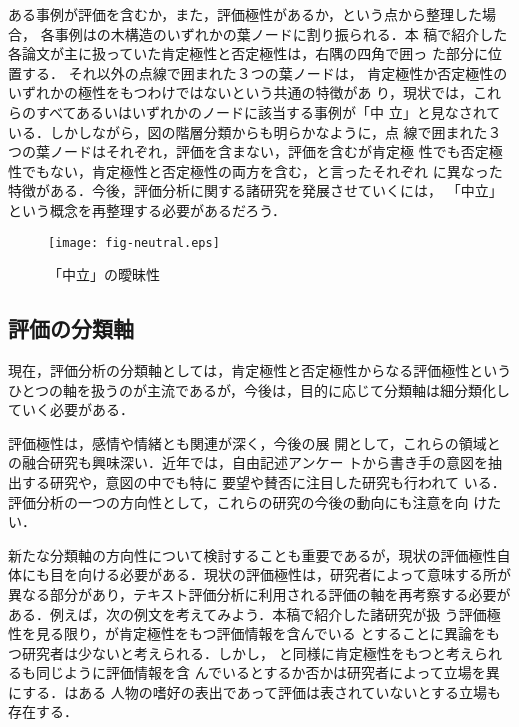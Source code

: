 ある事例が評価を含むか，また，評価極性があるか，という点から整理した場合，
各事例はの木構造のいずれかの葉ノードに割り振られる．本
稿で紹介した各論文が主に扱っていた肯定極性と否定極性は，右隅の四角で囲っ
た部分に位置する．
それ以外の点線で囲まれた３つの葉ノードは，
肯定極性か否定極性のいずれかの極性をもつわけではないという共通の特徴があ
り，現状では，これらのすべてあるいはいずれかのノードに該当する事例が「中
立」と見なされている．しかしながら，図の階層分類からも明らかなように，点
線で囲まれた３つの葉ノードはそれぞれ，評価を含まない，評価を含むが肯定極
性でも否定極性でもない，肯定極性と否定極性の両方を含む，と言ったそれぞれ
に異なった特徴がある．今後，評価分析に関する諸研究を発展させていくには，
「中立」という概念を再整理する必要があるだろう．

\begin{figure}[t]
  \begin{center} 
        \texttt{[image: fig-neutral.eps]}
    \caption{「中立」の曖昧性}
    \label{fig:neutral_tree}
  \end{center}
\end{figure}

\subsection{評価の分類軸}
\label{sec:eva_category}

現在，評価分析の分類軸としては，肯定極性と否定極性からなる評価極性という
ひとつの軸を扱うのが主流であるが，今後は，目的に応じて分類軸は細分類化し
ていく必要がある．

評価極性は，感情や情緒\cite{inui2000a,mera2002a}とも関連が深く，今後の展
開として，これらの領域との融合研究も興味深い．近年では，自由記述アンケー
トから書き手の意図を抽出する研究\cite{ootsuka2004a}や，意図の中でも特に
要望\cite{kanayama2005a}や賛否\cite{galley2004a}に注目した研究も行われて
いる．評価分析の一つの方向性として，これらの研究の今後の動向にも注意を向
けたい．

新たな分類軸の方向性について検討することも重要であるが，現状の評価極性自
体にも目を向ける必要がある．現状の評価極性は，研究者によって意味する所が
異なる部分があり，テキスト評価分析に利用される評価の軸を再考察する必要が
ある．例えば，次の例文を考えてみよう．本稿で紹介した諸研究が扱
う評価極性を見る限り，が肯定極性をもつ評価情報を含んでいる
とすることに異論をもつ研究者は少ないと考えられる．しかし， 
と同様に肯定極性をもつと考えられるも同じように評価情報を含
んでいるとするか否かは研究者によって立場を異にする．はある
人物の嗜好の表出であって評価は表されていないとする立場も存在する．

